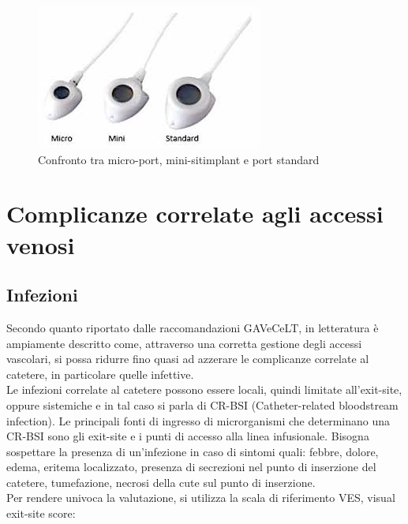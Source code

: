 \begin{figure}[H]
    \begin{center}
    \includegraphics[width=0.3\columnwidth]{img/portconfronto.jpeg}
    \vspace{-3mm}
    \end{center}
    \caption{Confronto tra micro-port, mini-sitimplant e port standard
    \cite{GAVECELTPICCPORT}}
    \label{fig:FIGURE_4.14}
\end{figure}

\section{Complicanze correlate agli accessi venosi}

\subsection{Infezioni}

Secondo quanto riportato dalle raccomandazioni GAVeCeLT, in letteratura è ampiamente descritto come, attraverso una 
corretta gestione degli accessi vascolari, si possa ridurre fino quasi ad azzerare le complicanze correlate al 
catetere, in particolare quelle infettive\cite{GAVECELTracc2021}.\\
Le infezioni correlate al catetere possono essere locali, quindi limitate all’exit-site, oppure sistemiche e in tal 
caso si parla di CR-BSI (Catheter-related bloodstream infection). Le principali fonti di ingresso di microrganismi 
che determinano una CR-BSI sono gli exit-site e i punti di accesso alla linea infusionale. 
Bisogna sospettare la presenza di un’infezione in caso di sintomi quali: febbre, dolore, edema, eritema localizzato, 
presenza di secrezioni nel punto di inserzione del catetere, tumefazione, necrosi della cute sul punto di inserzione\cite{AIOMCVC}.\\
Per rendere univoca la valutazione, si utilizza la scala di riferimento VES, visual exit-site score:

